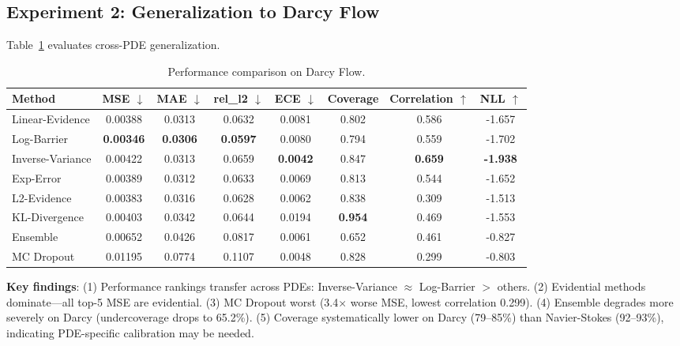 \subsection{Experiment 2: Generalization to Darcy Flow}

Table~\ref{tab:darcy_results} evaluates cross-PDE generalization.

\begin{table}[htbp]
\centering
\caption{Performance comparison on Darcy Flow.}
\label{tab:darcy_results}
\begin{tabular}{lccccccc}
\toprule
\textbf{Method} & \textbf{MSE} $\downarrow$ & \textbf{MAE} $\downarrow$ & \textbf{rel\_l2} $\downarrow$ & \textbf{ECE} $\downarrow$ & \textbf{Coverage} & \textbf{Correlation} $\uparrow$ & \textbf{NLL} $\uparrow$ \\
\midrule
Linear-Evidence & 0.00388 & 0.0313 & 0.0632 & 0.0081 & 0.802 & 0.586 & -1.657 \\
Log-Barrier & \textbf{0.00346} & \textbf{0.0306} & \textbf{0.0597} & 0.0080 & 0.794 & 0.559 & -1.702 \\
Inverse-Variance & 0.00422 & 0.0313 & 0.0659 & \textbf{0.0042} & 0.847 & \textbf{0.659} & \textbf{-1.938} \\
Exp-Error & 0.00389 & 0.0312 & 0.0633 & 0.0069 & 0.813 & 0.544 & -1.652 \\
L2-Evidence & 0.00383 & 0.0316 & 0.0628 & 0.0062 & 0.838 & 0.309 & -1.513 \\
KL-Divergence & 0.00403 & 0.0342 & 0.0644 & 0.0194 & \textbf{0.954} & 0.469 & -1.553 \\
\midrule
Ensemble \cite{lakshminarayanan2017simple} & 0.00652 & 0.0426 & 0.0817 & 0.0061 & 0.652 & 0.461 & -0.827 \\
MC Dropout \cite{gal2016dropout} & 0.01195 & 0.0774 & 0.1107 & 0.0048 & 0.828 & 0.299 & -0.803 \\
\bottomrule
\end{tabular}
\end{table}

\textbf{Key findings}: (1) Performance rankings transfer across PDEs: Inverse-Variance $\approx$ Log-Barrier $>$ others. (2) Evidential methods dominate---all top-5 MSE are evidential. (3) MC Dropout worst (3.4$\times$ worse MSE, lowest correlation 0.299). (4) Ensemble degrades more severely on Darcy (undercoverage drops to 65.2\%). (5) Coverage systematically lower on Darcy (79--85\%) than Navier-Stokes (92--93\%), indicating PDE-specific calibration may be needed.

